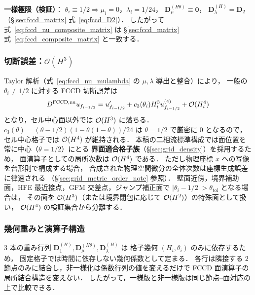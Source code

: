 \noindent\textbf{一様極限（検証）}：
$\theta_i \equiv 1/2 \Rightarrow \mu_i = 0$，$\lambda_i = 1/24$，
$\mathbf{D}_\mu^{(H\theta)} \equiv \mathbf{0}$，
$\mathbf{D}_\lambda^{(H)} = \mathbf{D}_2$（\S\ref{sec:fccd_matrix} 式~\eqref{eq:fccd_D2}）．
したがって式~\eqref{eq:fccd_nu_composite_matrix} は
\S\ref{sec:fccd_matrix} 式~\eqref{eq:fccd_composite_matrix} と一致する．

\subsubsection{切断誤差：\texorpdfstring{$\mathcal{O}(H^3)$}{O(H3)}}
\label{sec:fccd_nu_truncation}

Taylor 解析（式~\eqref{eq:fccd_nu_mulambda} の $\mu,\lambda$ 導出と整合）により，
一般の $\theta_i \neq 1/2$ に対する FCCD 切断誤差は
\begin{equation}
  D^{\mathrm{FCCD},\text{nu}} u_{f_{i-1/2}}
  = u'_{f_{i-1/2}} + c_3(\theta_i) H_i^3 u^{(4)}_{f_{i-1/2}} + \mathcal{O}(H_i^4)
  \label{eq:fccd_nu_truncation}
\end{equation}
となり，セル中心面以外では $\mathcal{O}(H^3)$ に落ちる．
$c_3(\theta) = (\theta-1/2)(1-\theta(1-\theta))/24$ は
$\theta = 1/2$ で厳密に $0$ となるので，
セル中心格子では $\mathcal{O}(H^4)$ が維持される．
本稿の二相流標準構成では面位置を常に中心（$\theta = 1/2$）にとる
\textbf{界面適合格子族}（\S\ref{sec:grid_density}）を採用するため，
面演算子としての局所次数は $\mathcal{O}(H^4)$ である．
ただし物理座標 $x$ への写像を台形則で構成する場合，
合成された物理空間微分の全体次数は座標生成誤差に律速される
（§\ref{sec:grid_metric_order_note} 参照）．
壁面近傍，境界補助面，HFE 最近接点，GFM 交差点，ジャンプ補正面で
$|\theta_i-1/2|>\theta_{\mathrm{tol}}$ となる場合は，
その面を $\mathcal{O}(H^3)$（または境界閉包に応じて $\mathcal{O}(H^2)$）の特殊面として扱い，
$\mathcal{O}(H^4)$ の検証集合から分離する．

\subsubsection{幾何重みと演算子構造}
\label{sec:fccd_nu_geometry_cost}

3 本の重み行列 $\mathbf{D}_1^{(H)}, \mathbf{D}_\mu^{(H\theta)}, \mathbf{D}_\lambda^{(H)}$ は
格子幾何 $(H_i,\theta_i)$ のみに依存するため，
固定格子では時間に依存しない幾何係数として定まる．
各行は隣接する 2 節点のみに結合し，非一様化は係数行列の値を変えるだけで
FCCD 面演算子の局所結合構造を変えない．
したがって，一様版と非一様版は同じ節点--面対応の上で比較できる．

